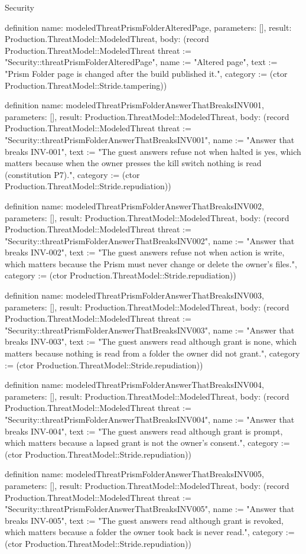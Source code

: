\begin{lexlean}{Security}
\begin{semanticmodule}
definition{
  name: modeledThreatPrismFolderAlteredPage,
  parameters: [],
  result: Production.ThreatModel::ModeledThreat,
  body: (record Production.ThreatModel::ModeledThreat {threat := "Security::threatPrismFolderAlteredPage", name := "Altered page", text := "Prism Folder page is changed after the build published it.", category := (ctor Production.ThreatModel::Stride.tampering)})
}

definition{
  name: modeledThreatPrismFolderAnswerThatBreaksINV001,
  parameters: [],
  result: Production.ThreatModel::ModeledThreat,
  body: (record Production.ThreatModel::ModeledThreat {threat := "Security::threatPrismFolderAnswerThatBreaksINV001", name := "Answer that breaks INV-001", text := "The guest answers refuse not when halted is yes, which matters because when the owner presses the kill switch nothing is read (constitution P7).", category := (ctor Production.ThreatModel::Stride.repudiation)})
}

definition{
  name: modeledThreatPrismFolderAnswerThatBreaksINV002,
  parameters: [],
  result: Production.ThreatModel::ModeledThreat,
  body: (record Production.ThreatModel::ModeledThreat {threat := "Security::threatPrismFolderAnswerThatBreaksINV002", name := "Answer that breaks INV-002", text := "The guest answers refuse not when action is write, which matters because the Prism must never change or delete the owner's files.", category := (ctor Production.ThreatModel::Stride.repudiation)})
}

definition{
  name: modeledThreatPrismFolderAnswerThatBreaksINV003,
  parameters: [],
  result: Production.ThreatModel::ModeledThreat,
  body: (record Production.ThreatModel::ModeledThreat {threat := "Security::threatPrismFolderAnswerThatBreaksINV003", name := "Answer that breaks INV-003", text := "The guest answers read although grant is none, which matters because nothing is read from a folder the owner did not grant.", category := (ctor Production.ThreatModel::Stride.repudiation)})
}

definition{
  name: modeledThreatPrismFolderAnswerThatBreaksINV004,
  parameters: [],
  result: Production.ThreatModel::ModeledThreat,
  body: (record Production.ThreatModel::ModeledThreat {threat := "Security::threatPrismFolderAnswerThatBreaksINV004", name := "Answer that breaks INV-004", text := "The guest answers read although grant is prompt, which matters because a lapsed grant is not the owner's consent.", category := (ctor Production.ThreatModel::Stride.repudiation)})
}

definition{
  name: modeledThreatPrismFolderAnswerThatBreaksINV005,
  parameters: [],
  result: Production.ThreatModel::ModeledThreat,
  body: (record Production.ThreatModel::ModeledThreat {threat := "Security::threatPrismFolderAnswerThatBreaksINV005", name := "Answer that breaks INV-005", text := "The guest answers read although grant is revoked, which matters because a folder the owner took back is never read.", category := (ctor Production.ThreatModel::Stride.repudiation)})
}


\end{semanticmodule}
\end{lexlean}
